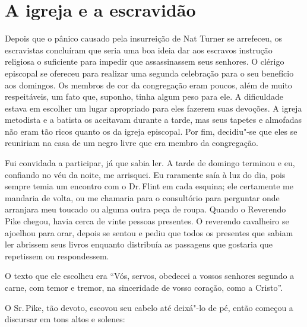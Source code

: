 \chapter*{A igreja e a escravidão}

Depois que o pânico causado pela
insurreição de Nat Turner se arrefeceu, os escravistas concluíram que
seria uma boa ideia dar aos escravos instrução religiosa o suficiente
para impedir que assassinassem seus senhores. O clérigo episcopal se
ofereceu para realizar uma segunda celebração para o seu benefício aos
domingos. Os membros de cor da congregação eram poucos, além de muito
respeitáveis, um fato que, suponho, tinha algum peso para ele. A
dificuldade estava em escolher um lugar apropriado para eles fazerem
suas devoções. A igreja metodista e a batista os aceitavam durante a
tarde, mas seus tapetes e almofadas não eram tão ricos quanto os da
igreja episcopal. Por fim, decidiu"-se que eles se reuniriam na casa de
um negro livre que era membro da congregação.

Fui convidada a participar, já que
sabia ler. A tarde de domingo terminou e eu, confiando no véu da noite,
me arrisquei. Eu raramente saía à luz do dia, pois sempre temia um
encontro com o Dr.\,Flint em cada esquina; ele certamente me mandaria de
volta, ou me chamaria para o consultório para perguntar onde arranjara
meu toucado ou alguma outra peça de roupa. Quando o Reverendo Pike
chegou, havia cerca de vinte pessoas presentes. O reverendo cavalheiro
se ajoelhou para orar, depois se sentou e pediu que todos os presentes
que sabiam ler abrissem seus livros enquanto distribuía as passagens que
gostaria que repetissem ou respondessem.

O texto que ele escolheu era ``Vós,
servos, obedecei a vossos senhores segundo a carne, com temor e tremor,
na sinceridade de vosso coração, como a Cristo''.

O Sr.\,Pike, tão devoto, escovou seu
cabelo até deixá"-lo de pé, então começou a discursar em tons altos e
solenes:

